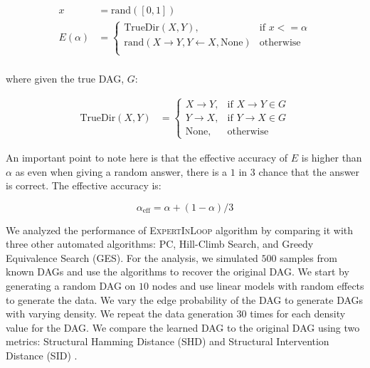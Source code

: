 \documentclass{uai2025} %
\begin{document}
\begin{equation}
	\begin{split}
		x &= \textrm{rand}([0, 1]) \\
		E(\alpha) &= \begin{cases} 
			\mathrm{TrueDir}(X, Y),  & \textrm{if  } x <= \alpha \\
			\textrm{rand}(X \rightarrow Y, Y \leftarrow X, \textrm{None}) & \textrm{otherwise} \\
				\end{cases} \\
	\end{split}
\end{equation}

where given the true DAG, $ G $:

\begin{equation}
	\begin{split}
	\mathrm{TrueDir}(X, Y) &= \begin{cases}
					X \rightarrow Y, & \textrm{if } X \rightarrow Y \in G \\
					Y \rightarrow X, & \textrm{if } Y \rightarrow X \in G \\
					\textrm{None}, & \textrm{otherwise }
				  \end{cases}
	\end{split}
\end{equation}

An important point to note here is that the effective accuracy of $ E $ is
higher than $ \alpha $ as even when giving a random answer, there is a $ 1 $ in
$ 3 $ chance that the answer is correct. The effective accuracy is:

\begin{equation}
	\alpha_{\mathrm{eff}} = \alpha + (1 - \alpha) / 3
\end{equation}


We analyzed the performance of \textsc{ExpertInLoop} algorithm by comparing it
with three other automated algorithms: PC, Hill-Climb Search, and Greedy
Equivalence Search (GES). For the analysis, we simulated $ 500 $ samples from
known DAGs and use the algorithms to recover the original DAG. We start by
generating a random DAG on $10$ nodes and use linear models with random effects
to generate the data. We vary the edge probability of the DAG to generate DAGs
with varying density. We repeat the data generation $30$ times for each density
value for the DAG. We compare the learned DAG to the original DAG using two
metrics: Structural Hamming Distance (SHD) and Structural Intervention Distance
(SID) \citep{Peters2015}.
\end{document}
